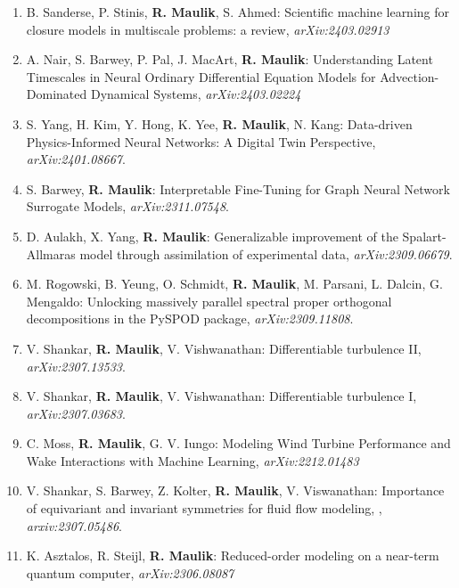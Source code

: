 \documentclass[letterpaper]{article}
\begin{document}
\begin{enumerate}

\item B. Sanderse, P. Stinis, \textbf{R. Maulik}, S. Ahmed: Scientific machine learning for closure models in multiscale problems: a review, {\it arXiv:2403.02913}

\item A. Nair, S. Barwey, P. Pal, J. MacArt, \textbf{R. Maulik}: Understanding Latent Timescales in Neural Ordinary Differential Equation Models for Advection-Dominated Dynamical Systems, {\it arXiv:2403.02224}

\item S. Yang, H. Kim, Y. Hong, K. Yee, \textbf{R. Maulik}, N. Kang:  Data-driven Physics-Informed Neural Networks: A Digital Twin Perspective, {\it arXiv:2401.08667}.

\item S. Barwey, \textbf{R. Maulik}: Interpretable Fine-Tuning for Graph Neural Network Surrogate Models, {\it arXiv:2311.07548}.

\item D. Aulakh, X. Yang, \textbf{R. Maulik}: Generalizable improvement of the Spalart-Allmaras model through assimilation of experimental data, {\it arXiv:2309.06679}.

\item M. Rogowski, B. Yeung, O. Schmidt, \textbf{R. Maulik}, M. Parsani, L. Dalcin, G. Mengaldo: Unlocking massively parallel spectral proper orthogonal decompositions in the PySPOD package, {\it arXiv:2309.11808}.

\item V. Shankar, \textbf{R. Maulik}, V. Vishwanathan: Differentiable turbulence II, {\it arXiv:2307.13533}.

\item V. Shankar, \textbf{R. Maulik}, V. Vishwanathan: Differentiable turbulence I, {\it arXiv:2307.03683}.

\item C. Moss, \textbf{R. Maulik}, G. V. Iungo: Modeling Wind Turbine Performance and Wake Interactions with Machine Learning, {\it arXiv:2212.01483}

\item V. Shankar, S. Barwey,  Z. Kolter, \textbf{R. Maulik}, V. Viswanathan: Importance of equivariant and invariant symmetries for fluid flow modeling, , {\it arxiv:2307.05486}.

\item K. Asztalos, R. Steijl, \textbf{R. Maulik}: Reduced-order modeling on a near-term quantum computer, {\it arXiv:2306.08087}

\end{enumerate}
\end{document}
